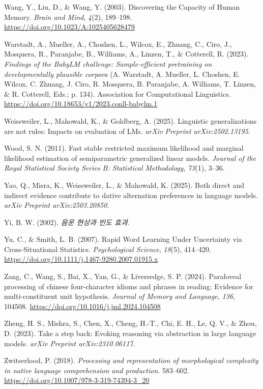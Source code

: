 \documentclass[
  12pt,
  letterpaper,
]{scrreprt}
\newlength{\cslhangindent}
\newenvironment{CSLReferences}[2] %
 {\begin{list}{}{%
  \setlength{\itemindent}{0pt}
  \setlength{\leftmargin}{0pt}
  \setlength{\parsep}{0pt}
  \ifodd #1
   \setlength{\leftmargin}{\cslhangindent}
   \setlength{\itemindent}{-1\cslhangindent}
  \fi
  \setlength{\itemsep}{#2\baselineskip}}}
 {\end{list}}
\begin{document}
\begin{CSLReferences}{1}{0}
Wang, Y., Liu, D., \& Wang, Y. (2003). Discovering the Capacity of Human
Memory. \emph{Brain and Mind}, \emph{4}(2), 189--198.
\url{https://doi.org/10.1023/A:1025405628479}

Warstadt, A., Mueller, A., Choshen, L., Wilcox, E., Zhuang, C., Ciro,
J., Mosquera, R., Paranjabe, B., Williams, A., Linzen, T., \& Cotterell,
R. (2023). \emph{Findings of the BabyLM challenge: Sample-efficient
pretraining on developmentally plausible corpora} (A. Warstadt, A.
Mueller, L. Choshen, E. Wilcox, C. Zhuang, J. Ciro, R. Mosquera, B.
Paranjabe, A. Williams, T. Linzen, \& R. Cotterell, Eds.; p. 134).
Association for Computational Linguistics.
\url{https://doi.org/10.18653/v1/2023.conll-babylm.1}

Weissweiler, L., Mahowald, K., \& Goldberg, A. (2025). Linguistic
generalizations are not rules: Impacts on evaluation of LMs. \emph{arXiv
Preprint arXiv:2502.13195}.

Wood, S. N. (2011). Fast stable restricted maximum likelihood and
marginal likelihood estimation of semiparametric generalized linear
models. \emph{Journal of the Royal Statistical Society Series B:
Statistical Methodology}, \emph{73}(1), 3--36.

Yao, Q., Misra, K., Weissweiler, L., \& Mahowald, K. (2025). Both direct
and indirect evidence contribute to dative alternation preferences in
language models. \emph{arXiv Preprint arXiv:2503.20850}.

Yi, B. W. (2002). \emph{음운 현상과 빈도 효과}.

Yu, C., \& Smith, L. B. (2007). Rapid Word Learning Under Uncertainty
via Cross-Situational Statistics. \emph{Psychological Science},
\emph{18}(5), 414--420.
\url{https://doi.org/10.1111/j.1467-9280.2007.01915.x}

Zang, C., Wang, S., Bai, X., Yan, G., \& Liversedge, S. P. (2024).
Parafoveal processing of chinese four-character idioms and phrases in
reading: Evidence for multi-constituent unit hypothesis. \emph{Journal
of Memory and Language}, \emph{136}, 104508.
\url{https://doi.org/10.1016/j.jml.2024.104508}

Zheng, H. S., Mishra, S., Chen, X., Cheng, H.-T., Chi, E. H., Le, Q. V.,
\& Zhou, D. (2023). Take a step back: Evoking reasoning via abstraction
in large language models. \emph{arXiv Preprint arXiv:2310.06117}.

Zwitserlood, P. (2018). \emph{Processing and representation of
morphological complexity in native language comprehension and
production}. 583--602.
\url{https://doi.org/10.1007/978-3-319-74394-3_20}

\end{CSLReferences}
\end{document}
